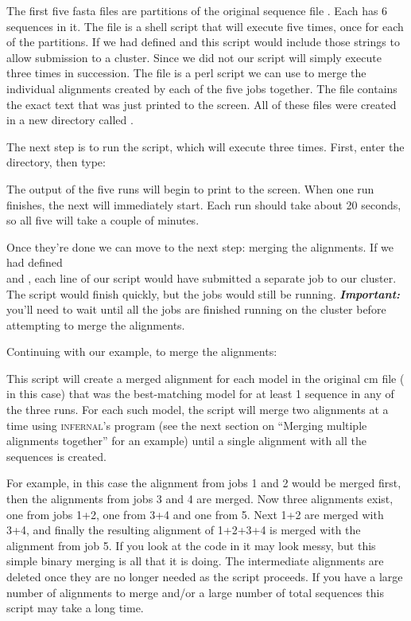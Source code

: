 The first five fasta files are partitions of the original sequence
file . Each has 6 sequences in it. The file
 is a shell script that will execute
 five times, once for each of the partitions. 
If we had defined  and
 this script would include those strings to
allow submission to a cluster. Since we did not our script will simply
execute  three times in succession. The file
 is a perl script we can use to merge the
individual alignments created by each of the five jobs together.
The  file contains the exact text that was just
printed to the screen. All of these files were created in a new
directory called .

The next step is to run the  script, which will
execute  three times. First, enter the
 directory, then type:


The output of the five  runs will begin to print to
the screen. When one run finishes, the next will immediately
start. Each run should take about 20 seconds, so all five will take a
couple of minutes. 

Once they're done we can move to the next step: merging
the alignments. If we had defined \\  and
, each line of our script would have submitted
a separate job to our cluster. The script would finish quickly, but
the jobs would still be running. \textbf{\emph{Important: }} you'll
need to wait until all the jobs are finished running on the
cluster before attempting to merge the alignments.

Continuing with our example, to merge the alignments:


This script will create a merged alignment for each model in the
original cm file ( in this case) that was the
best-matching model for at least 1 sequence in any of the three runs.
For each such model, the script will merge two alignments at a time
using \textsc{infernal}'s  program (see the next section
on ``Merging multiple alignments together'' for an example)
until a single alignment with all the sequences is created. 

For example, in this case the alignment from jobs 1 and 2 would be
merged first, then the alignments from jobs 3 and 4 are merged. Now
three alignments exist, one from jobs 1+2, one from 3+4 and one from
5. Next 1+2 are merged with 3+4, and finally the resulting alignment
of 1+2+3+4 is merged with the alignment from job 5. If you look at the
code in  it may look messy, but this
simple binary merging is all that it is doing. The intermediate
alignments are deleted once they are no longer needed as the script
proceeds. If you have a large number of alignments to merge and/or a
large number of total sequences this script may take a long time. 

